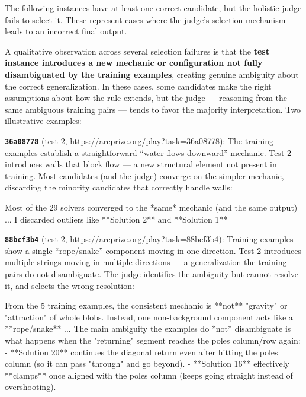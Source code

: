 \documentclass[11pt]{article}
\newenvironment{Shaded}{}{}
\newcommand{\NormalTok}[1]{#1}
\begin{document}
The following instances have at least one correct candidate, but the
holistic judge fails to select it. These represent cases where the
judge's selection mechanism leads to an incorrect final output.

A qualitative observation across several selection failures is that the
\textbf{test instance introduces a new mechanic or configuration not
fully disambiguated by the training examples}, creating genuine
ambiguity about the correct generalization. In these cases, some
candidates make the right assumptions about how the rule extends, but
the judge --- reasoning from the same ambiguous training pairs --- tends
to favor the majority interpretation. Two illustrative examples:

\textbf{\texttt{36a08778}} (test 2,
https://arcprize.org/play?task=36a08778): The training examples
establish a straightforward ``water flows downward'' mechanic. Test 2
introduces walls that block flow --- a new structural element not
present in training. Most candidates (and the judge) converge on the
simpler mechanic, discarding the minority candidates that correctly
handle walls:

\begin{Shaded}
\begin{Highlighting}[]
\NormalTok{Most of the 29 solvers converged to the *same* mechanic (and the same output)}
\NormalTok{...}
\NormalTok{I discarded outliers like **Solution 2** and **Solution 1**}
\end{Highlighting}
\end{Shaded}

\textbf{\texttt{88bcf3b4}} (test 2,
https://arcprize.org/play?task=88bcf3b4): Training examples show a
single ``rope/snake'' component moving in one direction. Test 2
introduces multiple strings moving in multiple directions --- a
generalization the training pairs do not disambiguate. The judge
identifies the ambiguity but cannot resolve it, and selects the wrong
resolution:

\begin{Shaded}
\begin{Highlighting}[]
\NormalTok{From the 5 training examples, the consistent mechanic is **not** "gravity" or}
\NormalTok{"attraction" of whole blobs. Instead, one non{-}background component acts like a}
\NormalTok{**rope/snake**}
\NormalTok{...}
\NormalTok{The main ambiguity the examples do *not* disambiguate is what happens when the}
\NormalTok{"returning" segment reaches the pole\textquotesingle{}s column/row again:}
\NormalTok{{-} **Solution 20** continues the diagonal return even after hitting the pole\textquotesingle{}s}
\NormalTok{  column (so it can pass "through" and go beyond).}
\NormalTok{{-} **Solution 16** effectively **clamps** once aligned with the pole\textquotesingle{}s column}
\NormalTok{  (keeps going straight instead of overshooting).}
\end{Highlighting}
\end{Shaded}
\end{document}
